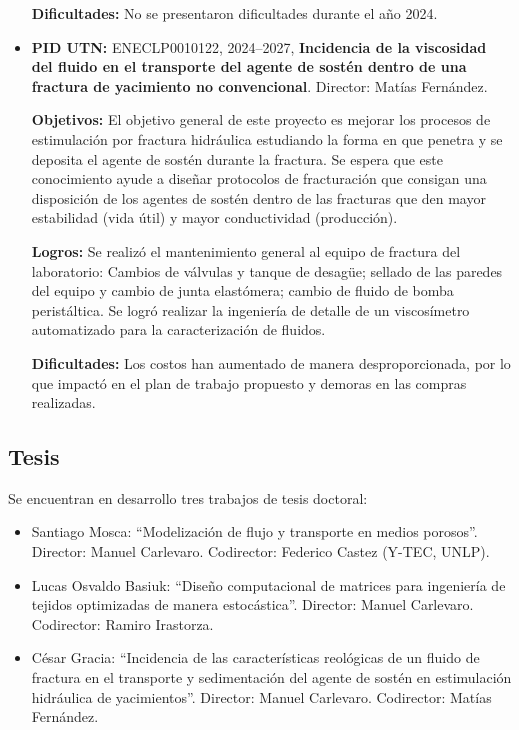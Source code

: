 \documentclass[a4paper,11pt,twoside,final,titlepage,onecolumn,openright]{report}
\begin{document}
\begin{itemize}
    \textbf{Dificultades:} No se presentaron dificultades durante el año 2024.

  \item \textbf{PID UTN:} ENECLP0010122, 2024--2027, \textbf{Incidencia de la viscosidad del fluido en el transporte del agente de sostén dentro de una fractura de yacimiento no convencional}. Director: Matías Fernández.

    \textbf{Objetivos:} El objetivo general de este proyecto es mejorar los procesos de estimulación por fractura hidráulica estudiando la forma en que penetra y se deposita el agente de sostén durante la fractura. Se espera que este conocimiento ayude a diseñar protocolos de fracturación que consigan una disposición de los agentes de sostén dentro de las fracturas que den mayor estabilidad (vida útil) y mayor conductividad (producción).

    \textbf{Logros:} Se realizó el mantenimiento general al equipo de fractura del laboratorio: Cambios de válvulas y tanque de desagüe; sellado de las paredes del equipo y cambio de junta elastómera; cambio de fluido de bomba peristáltica. Se logró realizar la ingeniería de detalle de un viscosímetro automatizado para la caracterización de fluidos.

    \textbf{Dificultades:} Los costos han aumentado de manera desproporcionada, por lo que impactó en el plan de trabajo propuesto y demoras en las compras realizadas.




\end{itemize}

\subsection{Tesis}

Se encuentran en desarrollo tres trabajos de tesis doctoral:
\begin{itemize}
 \item Santiago Mosca: ``Modelización de flujo y transporte en medios porosos''. Director: Manuel Carlevaro. Codirector: Federico Castez (Y-TEC, UNLP).
 \item Lucas Osvaldo Basiuk: ``Diseño computacional de matrices para ingeniería de tejidos optimizadas de manera estocástica''. Director: Manuel Carlevaro. Codirector: Ramiro Irastorza.
\item César Gracia: ``Incidencia de las características reológicas de un fluido de fractura en el transporte y sedimentación del agente de sostén en estimulación hidráulica de yacimientos''. Director: Manuel Carlevaro. Codirector: Matías Fernández.
\end{itemize}
\end{document}
